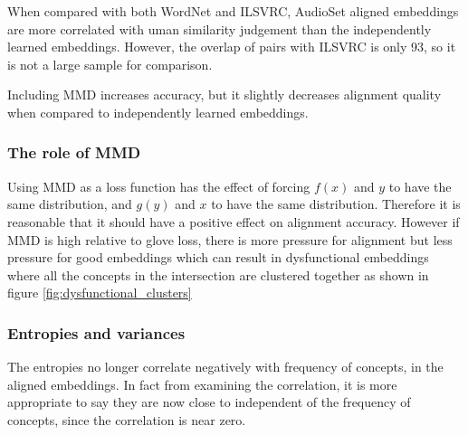 When compared with both WordNet and ILSVRC, AudioSet aligned embeddings are more correlated with uman similarity judgement than the independently learned embeddings. However, the overlap of pairs with ILSVRC is only 93, so it is not a large sample for comparison. 

Including MMD increases accuracy, but it slightly decreases alignment quality when compared to independently learned embeddings. 

\subsubsection{The role of MMD}

Using MMD as a loss function has the effect of forcing $f(x)$ and $y$ to have the same distribution, and  $g(y)$ and $x$ to have the same distribution. Therefore it is reasonable that it should have a positive effect on alignment accuracy. However if MMD is high relative to glove loss, there is more pressure for alignment but less pressure for good embeddings which can result in dysfunctional embeddings where all the concepts in the intersection are clustered together as shown in figure \ref{fig:dysfunctional_clusters}

\subsubsection{Entropies and variances}

The entropies no longer correlate negatively with frequency of concepts, in the aligned embeddings. In fact from examining the correlation, it is more appropriate to say they are now close to independent of the frequency of concepts, since the correlation is near zero. 


